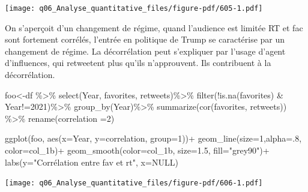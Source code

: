 \documentclass[
  letterpaper,
  DIV=11,
  numbers=noendperiod]{scrreprt}
\newenvironment{Shaded}{\begin{snugshade}}{\end{snugshade}}
\newcommand{\AttributeTok}[1]{\textcolor[rgb]{0.40,0.45,0.13}{#1}}
\newcommand{\ConstantTok}[1]{\textcolor[rgb]{0.56,0.35,0.01}{#1}}
\newcommand{\DecValTok}[1]{\textcolor[rgb]{0.68,0.00,0.00}{#1}}
\newcommand{\FloatTok}[1]{\textcolor[rgb]{0.68,0.00,0.00}{#1}}
\newcommand{\FunctionTok}[1]{\textcolor[rgb]{0.28,0.35,0.67}{#1}}
\newcommand{\NormalTok}[1]{\textcolor[rgb]{0.00,0.23,0.31}{#1}}
\newcommand{\OtherTok}[1]{\textcolor[rgb]{0.00,0.23,0.31}{#1}}
\newcommand{\SpecialCharTok}[1]{\textcolor[rgb]{0.37,0.37,0.37}{#1}}
\newcommand{\StringTok}[1]{\textcolor[rgb]{0.13,0.47,0.30}{#1}}
\begin{document}
\texttt{[image: q06\_Analyse\_quantitative\_files/figure-pdf/605-1.pdf]}

On s'aperçoit d'un changement de régime, quand l'audience est limitée RT
et fac sont fortement corrélés, l'entrée en politique de Trump se
caractérise par un changement de régime. La décorrélation peut
s'expliquer par l'usage d'agent d'influences, qui retweetent plus qu'ils
n'approuvent. Ils contribuent à la décorrélation.

\begin{Shaded}
\begin{Highlighting}[]
\NormalTok{foo}\OtherTok{\textless{}{-}}\NormalTok{df }\SpecialCharTok{\%\textgreater{}\%} \FunctionTok{select}\NormalTok{(Year, favorites, retweets)}\SpecialCharTok{\%\textgreater{}\%}
  \FunctionTok{filter}\NormalTok{(}\SpecialCharTok{!}\FunctionTok{is.na}\NormalTok{(favorites) }\SpecialCharTok{\&}\NormalTok{ Year}\SpecialCharTok{!=}\DecValTok{2021}\NormalTok{)}\SpecialCharTok{\%\textgreater{}\%}
  \FunctionTok{group\_by}\NormalTok{(Year)}\SpecialCharTok{\%\textgreater{}\%}
  \FunctionTok{summarize}\NormalTok{(}\FunctionTok{cor}\NormalTok{(favorites, retweets)) }\SpecialCharTok{\%\textgreater{}\%}
  \FunctionTok{rename}\NormalTok{(}\AttributeTok{correlation =}\DecValTok{2}\NormalTok{)}
            
\FunctionTok{ggplot}\NormalTok{(foo, }\FunctionTok{aes}\NormalTok{(}\AttributeTok{x=}\NormalTok{Year, }\AttributeTok{y=}\NormalTok{correlation, }\AttributeTok{group=}\DecValTok{1}\NormalTok{))}\SpecialCharTok{+}
  \FunctionTok{geom\_line}\NormalTok{(}\AttributeTok{size=}\DecValTok{1}\NormalTok{,}\AttributeTok{alpha=}\NormalTok{.}\DecValTok{8}\NormalTok{, }\AttributeTok{color=}\NormalTok{col\_1b)}\SpecialCharTok{+}
  \FunctionTok{geom\_smooth}\NormalTok{(}\AttributeTok{color=}\NormalTok{col\_1b, }\AttributeTok{size=}\FloatTok{1.5}\NormalTok{, }\AttributeTok{fill=}\StringTok{"grey90"}\NormalTok{)}\SpecialCharTok{+}
  \FunctionTok{labs}\NormalTok{(}\AttributeTok{y=}\StringTok{"Corrélation entre fav et rt"}\NormalTok{, }\AttributeTok{x=}\ConstantTok{NULL}\NormalTok{)}
\end{Highlighting}
\end{Shaded}

\texttt{[image: q06\_Analyse\_quantitative\_files/figure-pdf/606-1.pdf]}
\end{document}
